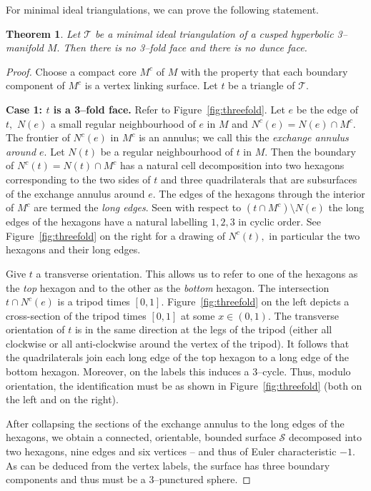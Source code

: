 \documentclass[a4paper]{gtart}
\def\tri{\mathcal{T}}
\def\manifold{M}
\def\core{M^c}
\theoremstyle{plain}
\newtheorem{theorem}{Theorem}%
\theoremstyle{definition}
\theoremstyle{remark}
\numberwithin{equation}{section}
\begin{document}
For minimal ideal triangulations, we can prove the following statement.

\begin{theorem}
\label{thm:no3fold}
Let $\tri$ be a minimal ideal triangulation of a cusped hyperbolic 3--manifold $\manifold.$ Then there is no 3--fold face and there is no dunce face.
\end{theorem}

\begin{proof}
Choose a compact core $\core$ of $\manifold$ with the property that each boundary component of $\core$ is a vertex linking surface. 
Let $t$ be a triangle of $\tri.$ 

  {\bf Case 1: $t$ is a 3--fold face.} Refer to Figure~\ref{fig:threefold}.
  Let $e$ be the edge of $t,$ $N(e)$ a small regular neighbourhood of $e$ in $\manifold$ and $N^c(e) = N(e) \cap \core.$
    The frontier of $N^c(e)$ in $\core$ is an annulus; we call this the \emph{exchange annulus around $e.$} Let $N(t)$ be a regular neighbourhood of $t$ in $\manifold .$ Then the boundary of $N^c(t) = N(t) \cap \core$ has a natural cell decomposition into two hexagons corresponding to the two sides of $t$ and three quadrilaterals that are subsurfaces of the exchange annulus around $e.$ The edges of the hexagons through the interior of $\core$ are termed the \emph{long edges}. Seen with respect to $(t\cap \core) \setminus N(e)$ the long edges of the hexagons have a natural labelling $1, 2, 3$ in cyclic order. See Figure~\ref{fig:threefold} on the right for a drawing of $N^c(t),$ in particular the two hexagons and their long edges.
     
Give $t$ a transverse orientation. This allows us to refer to one of the hexagons as the \emph{top} hexagon and to the other as the \emph{bottom} hexagon. The intersection $t \cap N^c(e)$ is a tripod times $[0,1].$ Figure~\ref{fig:threefold} on the left depicts a cross-section of the tripod times $[0,1]$ at some $x \in (0,1).$ The transverse orientation of $t$ is in the same direction at the legs of the tripod (either all clockwise or all anti-clockwise around the vertex of the tripod). It follows that the quadrilaterals join each long edge of the top hexagon to a long edge of the bottom hexagon. Moreover, on the labels this induces a 3--cycle. Thus, modulo orientation, the identification must be as shown in Figure~\ref{fig:threefold} (both on the left and on the right).
  
After collapsing the sections of the exchange annulus to the long edges of the hexagons, we obtain a connected, orientable, bounded surface $\mathcal{S}$ decomposed into two hexagons, nine edges and six vertices -- and thus of Euler characteristic $-1.$ As can be deduced from the vertex labels, the surface has three boundary components and thus must be a 3--punctured sphere. 


\end{proof}
\end{document}
